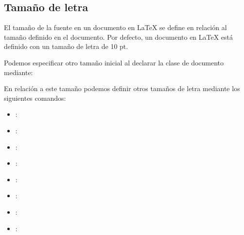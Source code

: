 \documentclass[11pt, a4paper]{article}
\begin{document}
\subsection{Tamaño de letra}

El tamaño de la fuente en un documento en LaTeX se define en relación al tamaño definido en el documento. Por defecto, un documento en LaTeX está definido con un tamaño de letra de 10 pt.

Podemos especificar otro tamaño inicial al declarar la clase de documento mediante:   


En relación a este tamaño podemos definir otros tamaños de letra mediante los siguientes comandos:
\begin{itemize}
\item {}: 
\item {}: 
\item {}: 
\item {}: 
\item {}: 
\item {}: 
\item {}: 
\item {}: 
\end{itemize}
\end{document}
